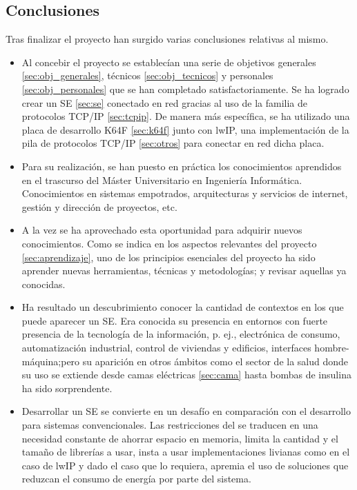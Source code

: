 {\label{ch:conclusiones-lineas}}

\subsection{Conclusiones}{\label{sec:conclusiones}}
Tras finalizar el proyecto han surgido varias conclusiones relativas al mismo.

\begin{itemize}
  \item Al concebir el proyecto se establecían una serie de objetivos generales
  \ref{sec:obj_generales}, técnicos \ref{sec:obj_tecnicos} y personales
  \ref{sec:obj_personales} que se han completado satisfactoriamente.
  Se ha logrado crear un SE \ref{sec:se} conectado en red gracias al uso de
  la familia de protocolos TCP/IP \ref{sec:tcpip}. De manera más específica,
  se ha utilizado una placa de desarrollo K64F \ref{sec:k64f} junto con lwIP,
  una implementación de la pila de protocolos TCP/IP \ref{sec:otros} para
  conectar en red dicha placa.
  
  \item Para su realización, se han puesto en práctica los conocimientos 
  aprendidos en el trascurso del Máster Universitario en Ingeniería Informática.
  Conocimientos en sistemas empotrados, arquitecturas y servicios de internet,
  gestión y dirección de proyectos, etc.

  \item A la vez se ha aprovechado esta oportunidad para adquirir nuevos
  conocimientos. Como se indica en los aspectos relevantes del proyecto
  \ref{sec:aprendizaje}, uno de los principios esenciales del proyecto ha sido
  aprender nuevas herramientas, técnicas y metodologías; y revisar aquellas ya
  conocidas.

  \item Ha resultado un descubrimiento conocer la cantidad de contextos en los
  que puede aparecer un SE. Era conocida su presencia en entornos con fuerte
  presencia de la tecnología de la información, p. ej., electrónica de consumo,
  automatización industrial, control de viviendas y edificios, interfaces
  hombre-máquina;pero su aparición en otros ámbitos como el sector de la salud
  donde su uso se extiende desde camas eléctricas \ref{sec:cama} hasta bombas
  de insulina ha sido sorprendente.

  \item Desarrollar un SE se convierte en un desafío en comparación con el
  desarrollo para sistemas convencionales. Las restricciones del 
   se traducen en una necesidad constante de ahorrar
  espacio en memoria, limita la cantidad y el tamaño de librerías a usar,
  insta a usar implementaciones livianas como en el caso de lwIP y dado el
  caso que lo requiera, apremia el uso de soluciones que reduzcan el consumo
  de energía por parte del sistema.


\end{itemize}
